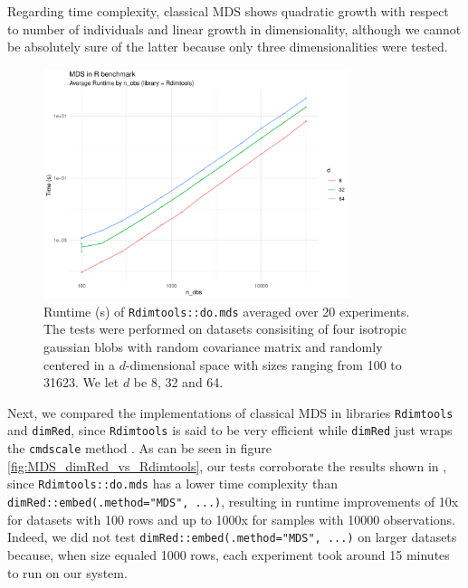 \documentclass[a4paper,12pt]{article}
\begin{document}
Regarding time complexity, classical MDS shows quadratic growth with respect to number of individuals and linear growth in dimensionality, although we cannot be absolutely sure of the latter because only three dimensionalities were tested.

\begin{figure}[ht]
    \centering
    \includegraphics[width=0.8\textwidth]{figures/MDS_Rdimtools.pdf}
    \caption{Runtime (s) of \texttt{Rdimtools::do.mds} averaged over 20 experiments. The tests were performed on datasets consisiting of four isotropic gaussian blobs with random covariance matrix and randomly centered in a $d$-dimensional space with sizes ranging from 100 to 31623. We let $d$ be 8, 32 and 64.}
    \label{fig:MDS_Rdimtools}
\end{figure}

Next, we compared the implementations of classical MDS in libraries \texttt{Rdimtools} and \texttt{dimRed}, since \texttt{Rdimtools} is said to be very efficient while \texttt{dimRed} just wraps the \texttt{cmdscale} method \cite{Kraemer2018dimRedAC}. As can be seen in figure \ref{fig:MDS_dimRed_vs_Rdimtools}, our tests corroborate the results shown in \cite{Rdimtools}, since \texttt{Rdimtools::do.mds} has a lower time complexity than \texttt{dimRed::embed(.method="MDS", ...)}, resulting in runtime improvements of 10x for datasets with 100 rows and up to 1000x for samples with 10000 observations. Indeed, we did not test \texttt{dimRed::embed(.method="MDS", ...)} on larger datasets because, when size equaled 1000 rows, each experiment took around 15 minutes to run on our system.
\end{document}
